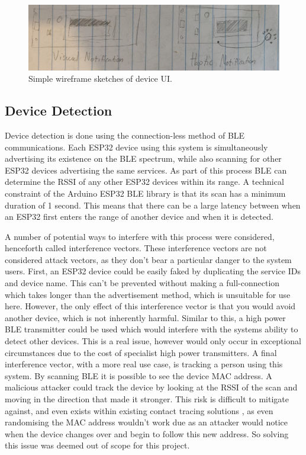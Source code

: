 \documentclass{l4proj}
\begin{document}
\begin{figure}[!htb]
    \centering
    \includegraphics[width=1.0\linewidth]{images/device_ui_sketch.png}

    \caption{ Simple wireframe sketches of device UI. }

    \label{fig:device_ui_sketch}
\end{figure}

\subsection{Device Detection}

Device detection is done using the connection-less method of BLE communications. Each ESP32 device using this system is simultaneously advertising its existence on the BLE spectrum, while also scanning for other ESP32 devices advertising the same services. As part of this process BLE can determine the RSSI of any other ESP32 devices within its range. A technical constraint of the Arduino ESP32 BLE library is that its scan has a minimum duration of 1 second. This means that there can be a large latency between when an ESP32 first enters the range of another device and when it is detected.

A number of potential ways to interfere with this process were considered, henceforth called interference vectors. These interference vectors are not considered attack vectors, as they don't bear a particular danger to the system users. First, an ESP32 device could be easily faked by duplicating the service IDs and device name. This can't be prevented without making a full-connection which takes longer than the advertisement method, which is unsuitable for use here. However, the only effect of this interference vector is that you would avoid another device, which is not inherently harmful. Similar to this, a high power BLE transmitter could be used which would interfere with the systems ability to detect other devices. This is a real issue, however would only occur in exceptional circumstances due to the cost of specialist high power transmitters. A final interference vector, with a more real use case, is tracking a person using this system. By scanning BLE it is possible to see the device MAC address. A malicious attacker could track the device by looking at the RSSI of the scan and moving in the direction that made it stronger. This risk is difficult to mitigate against, and even exists within existing contact tracing solutions \citep{ahmed_survey_2020}, as even randomising the MAC address wouldn't work due as an attacker would notice when the device changes over and begin to follow this new address. So solving this issue was deemed out of scope for this project.
\end{document}
